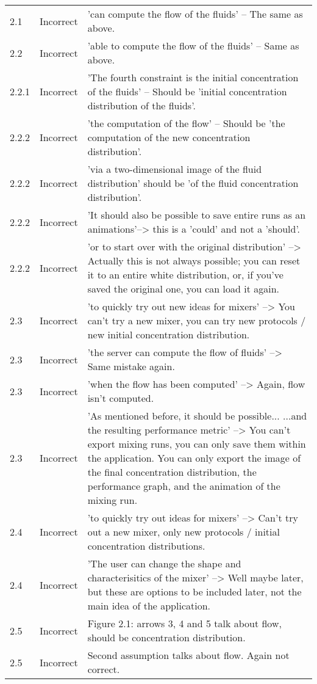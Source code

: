 \begin{longtable}{l|l|p{}}
2.1 & Incorrect & 'can compute the flow of the fluids' -- The same as above. \\
2.2 & Incorrect & 'able to compute the flow of the fluids' -- Same as above. \\
2.2.1 & Incorrect & 'The fourth constraint is the initial concentration of the fluids' -- Should be 'initial concentration distribution of the fluids'. \\
2.2.2 & Incorrect & 'the computation of the flow' -- Should be 'the computation of the new concentration distribution'. \\
2.2.2 & Incorrect & 'via a two-dimensional image of the fluid distribution' should be 'of the fluid concentration distribution'.\\
2.2.2 & Incorrect & 'It should also be possible to save entire runs as an animations'--> this is a 'could' and not a 'should'. \\
2.2.2 & Incorrect & 'or to start over with the original distribution' --> Actually this is not always possible; you can reset it to an entire white
distribution, or, if you've saved the original one, you can load it again. \\
2.3 & Incorrect & 'to quickly try out new ideas for mixers' --> You can't try a new mixer, you can try new protocols / new initial concentration
distribution.\\
2.3 & Incorrect & 'the server can compute the flow of fluids' --> Same mistake again.\\
2.3 & Incorrect & 'when the flow has been computed' --> Again, flow isn't computed.\\
2.3 & Incorrect & 'As mentioned before, it should be possible... ...and the resulting performance metric' --> You can't export mixing runs, you can only save them within the application. You can only export the image of the final concentration distribution, the performance graph, and the animation of the mixing run.\\
2.4 & Incorrect & 'to quickly try out ideas for mixers' --> Can't try out a new mixer, only new protocols / initial concentration distributions.\\
2.4 & Incorrect & 'The user can change the shape and characterisitics of the mixer' --> Well maybe later, but these are options to be included later, not the main idea of the application.\\
2.5 & Incorrect & Figure 2.1: arrows 3, 4 and 5 talk about flow, should be concentration distribution.\\
2.5 & Incorrect & Second assumption talks about flow. Again not correct.\\
\end{longtable}

